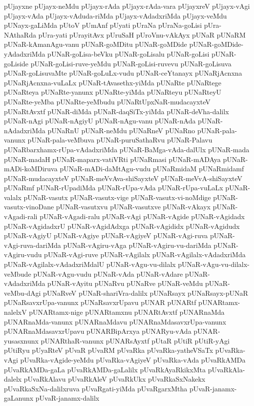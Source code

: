 {pUjayxne
pUjayx-neMdu
pUjayx-rAda
pUjayx-rAda-vara
pUjayxreV
pUjayx-vAgi
pUjayx-vAda
pUjayx-vAduda-riMda
pUjayx-vAdadxriMda
pUjayx-veMdu
pUNayx-gaLiMda
pUtoV
pUmAnf
pUyati
pUraNa
pUraNa-goLisi
pUra-NAthaRda
pUra-yati
pUrayitAvx
pUruSaH
pUroVnu-vAkAyx
pUNaR
pUNaRM
pUNaR-kAmanAgu-vanu
pUNaR-goMDitu
pUNaR-goMDide
pUNaR-goMDide-yAdadxriMda
pUNaR-goLisa-beVku
pUNaR-goLisalu
pUNaR-goLisi
pUNaR-goLiside
pUNaR-goLisi-ruve-yeMdu
pUNaR-goLisi-ruvevu
pUNaR-goLisuva
pUNaR-goLisuvaMte
pUNaR-goLuLx-vudu
pUNaR-ceYtanayx
pUNaRjAcnxna
pUNaRjAcnxna-vuLaLx
pUNaR-tAvasethx-yiMda
pUNaRte
pUNaRtege
pUNaRteya
pUNaRte-yanunx
pUNaRte-yiMda
pUNaRteyu
pUNaRteyU
pUNaRte-yeMba
pUNaRte-yeMbudu
pUNaRtUpxNaR-mudacayxteV
pUNaRtAvxtf
pUNaR-diMda
pUNaR-daqSiTx-yiMda
pUNaR-deVha-dalilx
pUNaR-nAgi
pUNaR-nAgiyU
pUNaR-nAgu-vanu
pUNaR-nAda
pUNaR-nAdadxriMda
pUNaRnU
pUNaR-neMdu
pUNaRneV
pUNaRno
pUNaR-pala-vanunx
pUNaR-pala-veMbuva
pUNaR-puruSathaRvu
pUNaR-Palavu
pUNaRbarxhamx-rUpa-vAdadxriMda
pUNaR-BaMga-vAda-dalUlx
pUNaR-mada
pUNaR-madaH
pUNaR-maparx-vatiVRti
pUNaRmasi
pUNaR-mADAya
pUNaR-mADi-koMDiruva
pUNaR-mADi-daMtAgu-vudu
pUNaRmidaM
pUNaRmidamf
pUNaR-mudacayxteV
pUNaR-meVvAva-shiSayxteV
pUNaR-meVvA-shiSayxteV
pUNaRmf
pUNaR-rUpadiMda
pUNaR-rUpa-vAda
pUNaR-rUpa-vuLaLx
pUNaR-valalx
pUNaR-vasutx
pUNaR-vasutx-vige
pUNaR-vasutx-vi-noMdige
pUNaR-vasutx-vinoDane
pUNaR-vasutxvu
pUNaR-vasutxve
pUNaR-vAkayx
pUNaR-vAgadi-rali
pUNaR-vAgadi-ralu
pUNaR-vAgi
pUNaR-vAgide
pUNaR-vAgidadx
pUNaR-vAgidadxrU
pUNaR-vAgidAdxga
pUNaR-vAgididx
pUNaR-vAgidudx
pUNaR-vAgiyU
pUNaR-vAgiye
pUNaR-vAgiyeV
pUNaR-vAgi-ruva
pUNaR-vAgi-ruva-dariMda
pUNaR-vAgiru-vAga
pUNaR-vAgiru-vu-dariMda
pUNaR-vAgiru-vudu
pUNaR-vAgi-ruve
pUNaR-vAgilalx
pUNaR-vAgilalx-vAdadxriMda
pUNaR-vAgilalx-vAdadxriMdalU
pUNaR-vAgu-vu-dilalx
pUNaR-vAgu-vu-dilalx-veMbude
pUNaR-vAgu-vudu
pUNaR-vAda
pUNaR-vAdare
pUNaR-vAdadxriMda
pUNaR-vAyitu
pUNaRvu
pUNaRve
pUNaR-veMdu
pUNaR-veMbu-dAgi
pUNaRveV
pUNaR-shariVra-dalilx
pUNaRsayx
pUNaRsayx-pUNaR
pUNaRsavxrUpa-vanunx
pUNaRsavxrUpavu
pUNAR
pUNARtf
pUNARtamx-nalelxV
pUNARtamx-nige
pUNARtamxnu
pUNARtAvxtf
pUNARnaMda
pUNARnaMda-vanunx
pUNARnaMdavu
pUNARnaMdasavxrUpa-vanunx
pUNARnaMdasavxrUpavu
pUNARBipArxya
pUNARyu-vAda
pUNAR-yusasxnunx
pUNARthaR-vanunx
pUNARsAyxtf
pUtaR
pUtiR
pUtiR-yAgi
pUtiRyu
pUyaRteV
pUvaR
pUvaRM
pUvaRka
pUvaRka-yatheVSaTx
pUvaRka-vAgi
pUvaRka-vAgide-yeMdu
pUvaRka-vAgiyeV
pUvaRka-vAda
pUvaRkAMDa
pUvaRkAMDa-gaLa
pUvaRkAMDa-gaLalilx
pUvaRkAyaRkikxMta
pUvaRkAla-dalelx
pUvaRkAlavu
pUvaRkAleV
pUvaRkUkx
pUvaRkaSxNakekx
pUvaRkaSxNa-dalilxruva
pUvaRgati-yiMda
pUvaRgarxMtha
pUvaR-janamx-gaLanunx
pUvaR-janamx-dalilx
}
